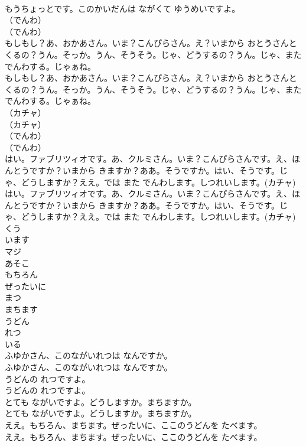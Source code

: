 \documentclass[8pt]{extreport}
\begin{document}
\begin{CJK}{UTF8}{min}
\\	もうちょっとです。このかいだんは ながくて ゆうめいですよ。 
\\	（でんわ）	
\\	（でんわ） 
\\	もしもし？あ、おかあさん。いま？こんぴらさん。え？いまから おとうさんと くるの？うん。そっか。うん、そうそう。じゃ、どうするの？うん。じゃ、またでんわする。じゃぁね。	
\\	もしもし？あ、おかあさん。いま？こんぴらさん。え？いまから おとうさんと くるの？うん。そっか。うん、そうそう。じゃ、どうするの？うん。じゃ、またでんわする。じゃぁね。 
\\	（カチャ）	
\\	（カチャ） 
\\	（でんわ）	
\\	（でんわ） 
\\	はい。ファブリツィオです。あ、クルミさん。いま？こんぴらさんです。え、ほんとうですか？いまから きますか？ああ。そうですか。はい、そうです。じゃ、どうしますか？ええ。では また でんわします。しつれいします。(カチャ)	
\\	はい。ファブリツィオです。あ、クルミさん。いま？こんぴらさんです。え、ほんとうですか？いまから きますか？ああ。そうですか。はい、そうです。じゃ、どうしますか？ええ。では また でんわします。しつれいします。(カチャ) 
\\	くう
\\	います
\\	マジ
\\	あそこ
\\	もちろん
\\	ぜったいに
\\	まつ
\\	まちます
\\	うどん
\\	れつ
\\	いる
\\	ふゆかさん、このながいれつは なんですか。	
\\	ふゆかさん、このながいれつは なんですか。 
\\	うどんの れつですよ。	
\\	うどんの れつですよ。 
\\	とても ながいですよ。どうしますか。まちますか。	
\\	とても ながいですよ。どうしますか。まちますか。 
\\	ええ。もちろん、まちます。ぜったいに、ここのうどんを たべます。	
\\	ええ。もちろん、まちます。ぜったいに、ここのうどんを たべます。 

\end{CJK}
\end{document}
